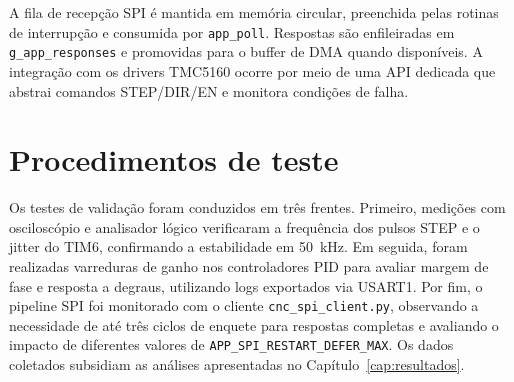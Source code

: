A fila de recepção SPI é mantida em memória circular, preenchida pelas
rotinas de interrupção e consumida por \texttt{app\_poll}. Respostas são
enfileiradas em \texttt{g\_app\_responses} e promovidas para o buffer de DMA
quando disponíveis. A integração com os drivers TMC5160 ocorre por meio
de uma API dedicada que abstrai comandos STEP/DIR/EN e monitora
condições de falha.

\section{Procedimentos de teste}

Os testes de validação foram conduzidos em três frentes. Primeiro,
medições com osciloscópio e analisador lógico verificaram a frequência
dos pulsos STEP e o jitter do TIM6, confirmando a estabilidade em
\SI{50}{\kilo\hertz}. Em seguida, foram realizadas varreduras de ganho
nos controladores PID para avaliar margem de fase e resposta a degraus,
utilizando logs exportados via USART1. Por fim, o pipeline SPI foi
monitorado com o cliente \texttt{cnc\_spi\_client.py}, observando a necessidade de
até três ciclos de enquete para respostas completas e avaliando o
impacto de diferentes valores de \texttt{APP\_SPI\_RESTART\_DEFER\_MAX}. Os dados
coletados subsidiam as análises apresentadas no
Capítulo~\ref{cap:resultados}.
